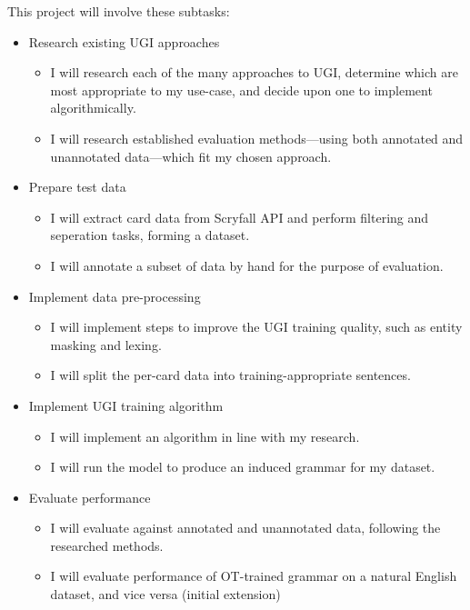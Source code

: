 \documentclass{article}
\begin{document}
This project will involve these subtasks:
\begin{itemize}
    \item Research existing UGI approaches
    \begin{itemize}
        \item I will research each of the many approaches to UGI, determine which are most appropriate to my use-case, and decide upon one to implement algorithmically.
        \item I will research established evaluation methods---using both annotated and unannotated data---which fit my chosen approach.
    \end{itemize}
    \item Prepare test data
    \begin{itemize}
        \item I will extract card data from Scryfall API and perform filtering and seperation tasks, forming a dataset.
        \item I will annotate a subset of data by hand for the purpose of evaluation.
    \end{itemize}
    \item Implement data pre-processing
    \begin{itemize}
        \item I will implement steps to improve the UGI training quality, such as entity masking and lexing.
        \item I will split the per-card data into training-appropriate sentences.
    \end{itemize}
    \item Implement UGI training algorithm
    \begin{itemize}
        \item I will implement an algorithm in line with my research.
        \item I will run the model to produce an induced grammar for my dataset.
    \end{itemize}
    \item Evaluate performance
    \begin{itemize}
        \item I will evaluate against annotated and unannotated data, following the researched methods.
        \item I will evaluate performance of OT-trained grammar on a natural English dataset, and vice versa (initial extension)
    \end{itemize}
\end{itemize}
\end{document}
